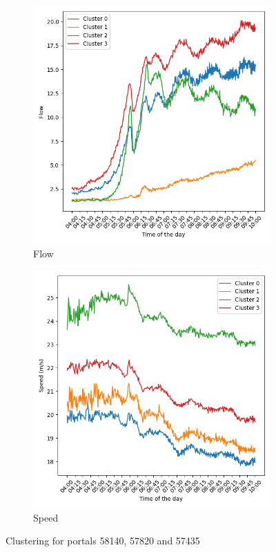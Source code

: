 	\begin{figure}[H]
		\centering
		\begin{subfigure}{0.49 \linewidth}
			\includegraphics[width=\textwidth]{../Plots/Flow/clustering_3portals}
			\caption{Flow}
		\end{subfigure}
		\begin{subfigure}{0.49 \linewidth}
			\includegraphics[width=\textwidth]{../Plots/Speed/clustering_3portals}
			\caption{Speed}
		\end{subfigure}
		\caption{Clustering for portals 58140, 57820 and 57435}
		\label{fig:clustering_3portals}
	\end{figure}

